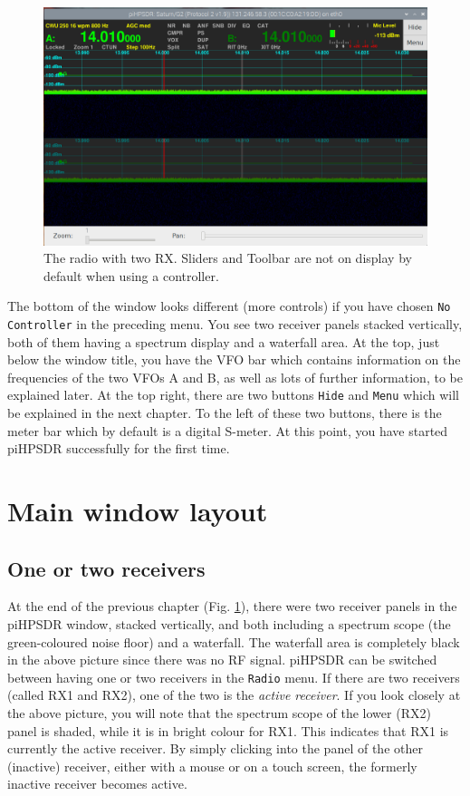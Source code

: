 \documentclass[12pt]{book}
\def\rett#1{\texttt{\color{red}#1}}
\def\pH{pi\-HPSDR\xspace}
\begin{document}
\begin{figure}
\center
\includegraphics[width=12cm]{FirstDisplay.png}
\caption{The radio with two RX. Sliders and Toolbar are not on display
by default when using a controller.}
\label{fig:FirstDisplay}
\end{figure}

The bottom of the window looks different (more controls) if you have chosen \rett{No Controller} in the
preceding menu.
You see two receiver panels stacked vertically, both of them having a spectrum display and a waterfall area.
At the top,
just below the window title, you have the VFO bar which contains information on the frequencies of the two
VFOs A and B,
as well as lots of further information, to be explained later. At the top right, there are two buttons
\rett{Hide}
and \rett{Menu} which will be explained in the next chapter. To the left of these two buttons, there is the
meter bar which by default is a digital S-meter. At this point, you have started \pH successfully for
the first time.

\chapter{Main window layout}

\section{One or two receivers}
At the end of the previous chapter (Fig. \ref{fig:FirstDisplay}),
 there were two receiver panels in the
\pH window, stacked vertically, and both including a spectrum scope
(the green-coloured noise floor) and a waterfall. The waterfall area
is completely black in the above picture since there was no RF signal.
\pH can be switched between having one or two receivers in the
\texttt{Radio} menu. If there are two receivers (called RX1 and RX2),
 one of the two is the \textit{active receiver}. If you look closely
 at the above picture, you will note that the spectrum scope of
 the lower (RX2) panel is shaded, while it is in bright colour for RX1.
 This indicates that RX1 is currently the active receiver. By simply
 clicking into the panel of the other (inactive) receiver, either with
 a mouse or on a touch screen, the formerly inactive receiver becomes
 active.
\end{document}
